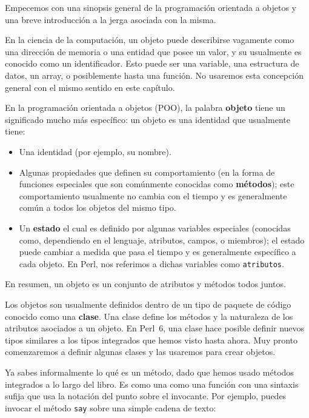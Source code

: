 Empecemos con una sinopsis general de la programación orientada a objetos
y una breve introducción a la jerga asociada con la misma.


En la ciencia de la computación, un objeto puede describirse 
vagamente como una dirección de memoria o una entidad que 
posee un valor, y su usualmente es conocido como un identificador.
Esto puede ser una variable, una estructura de datos, un array,
o posiblemente hasta una función. No usaremos esta concepción
general con el mismo sentido en este capítulo.

En la programación orientada a objetos (POO), la palabra
{\bf objeto} tiene un significado mucho más específico: un 
objeto es una identidad que usualmente tiene:
\begin{itemize}

\item Una identidad (por ejemplo, su nombre).

\item Algunas propiedades que definen su comportamiento (en la forma
de funciones especiales que son comúnmente conocidas como {\bf métodos});
este comportamiento usualmente no cambia con el tiempo y es 
generalmente común a todos los objetos del mismo tipo.

\item Un {\bf estado} el cual es definido por algunas variables
especiales (conocidas como, dependiendo en el lenguaje, atributos,
campos, o miembros); el estado puede cambiar a medida que pasa el 
tiempo y es generalmente específico a cada objeto. En Perl, nos
referimos a dichas variables como {\tt atributos}.
\end{itemize}

En resumen, un objeto es un conjunto de atributos y métodos
todos juntos.

Los objetos son usualmente definidos dentro de un tipo
de paquete de código conocido como una {\bf clase}. 
Una clase define los métodos y la naturaleza de los
atributos asociados a un objeto. En Perl~6, una clase
hace posible definir nuevos tipos similares a los tipos
integrados que hemos visto hasta ahora. Muy pronto comenzaremos
a definir algunas clases y las usaremos para crear objetos.

Ya sabes informalmente lo qué es un método, dado que hemos
usado métodos integrados a lo largo del libro. Es como una 
como una función con una sintaxis sufija que usa la notación
del punto sobre el invocante. Por ejemplo, puedes invocar el
método {\tt say} sobre una simple cadena de texto:

